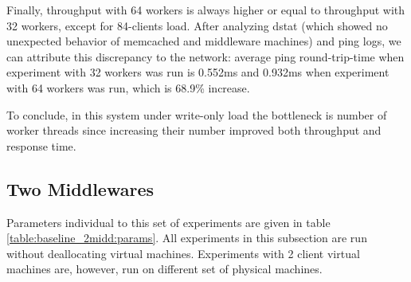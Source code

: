 \documentclass[11pt,a4paper]{article}
\begin{document}
Finally, throughput with 64 workers is always higher or equal to throughput with 32 workers, except for 84-clients load. After analyzing dstat (which showed no unexpected behavior of memcached and middleware machines) and ping logs, we can attribute this discrepancy to the network: average ping round-trip-time when experiment with 32 workers was run is 0.552ms and 0.932ms when experiment with 64 workers was run, which is 68.9\% increase.

To conclude, in this system under write-only load the bottleneck is number of worker threads since increasing their number improved both throughput and response time.




\subsection{Two Middlewares}

Parameters individual to this set of experiments are given in table \ref{table:baseline_2midd:params}. All experiments in this subsection are run without deallocating virtual machines. Experiments with 2 client virtual machines are, however, run on different set of physical machines.
\end{document}
